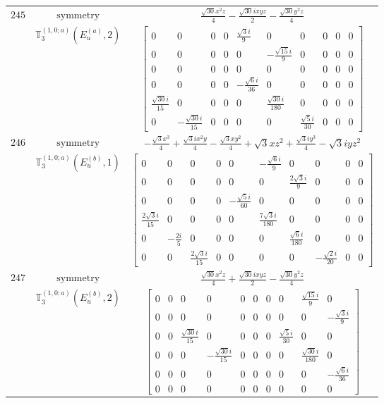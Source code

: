 \documentclass[fleqn,8pt,landscape]{jsarticle}
\begin{document}
\begin{longtable}{ccc}
$ 245 $ & $ \text{symmetry} $ & $ \frac{\sqrt{30} x^{2} z}{4} - \frac{\sqrt{30} i x y z}{2} - \frac{\sqrt{30} y^{2} z}{4} $ \\
$  $ & $ \mathbb{T}_{3}^{(1,0;a)}(E_{u}^{(a)},2) $ & $ \begin{bmatrix} 0 & 0 & 0 & 0 & \frac{\sqrt{3} i}{9} & 0 & 0 & 0 & 0 & 0 \\ 0 & 0 & 0 & 0 & 0 & - \frac{\sqrt{15} i}{9} & 0 & 0 & 0 & 0 \\ 0 & 0 & 0 & 0 & 0 & 0 & 0 & 0 & 0 & 0 \\ 0 & 0 & 0 & 0 & - \frac{\sqrt{6} i}{36} & 0 & 0 & 0 & 0 & 0 \\ \frac{\sqrt{30} i}{15} & 0 & 0 & 0 & 0 & \frac{\sqrt{30} i}{180} & 0 & 0 & 0 & 0 \\ 0 & - \frac{\sqrt{30} i}{15} & 0 & 0 & 0 & 0 & \frac{\sqrt{5} i}{30} & 0 & 0 & 0 \end{bmatrix} $ \\ \hline
$ 246 $ & $ \text{symmetry} $ & $ - \frac{\sqrt{3} x^{3}}{4} + \frac{\sqrt{3} i x^{2} y}{4} - \frac{\sqrt{3} x y^{2}}{4} + \sqrt{3} x z^{2} + \frac{\sqrt{3} i y^{3}}{4} - \sqrt{3} i y z^{2} $ \\
$  $ & $ \mathbb{T}_{3}^{(1,0;a)}(E_{u}^{(b)},1) $ & $ \begin{bmatrix} 0 & 0 & 0 & 0 & 0 & - \frac{\sqrt{6} i}{9} & 0 & 0 & 0 & 0 \\ 0 & 0 & 0 & 0 & 0 & 0 & \frac{2 \sqrt{3} i}{9} & 0 & 0 & 0 \\ 0 & 0 & 0 & 0 & - \frac{\sqrt{5} i}{60} & 0 & 0 & 0 & 0 & 0 \\ \frac{2 \sqrt{3} i}{15} & 0 & 0 & 0 & 0 & \frac{7 \sqrt{3} i}{180} & 0 & 0 & 0 & 0 \\ 0 & - \frac{2 i}{5} & 0 & 0 & 0 & 0 & \frac{\sqrt{6} i}{180} & 0 & 0 & 0 \\ 0 & 0 & \frac{2 \sqrt{3} i}{15} & 0 & 0 & 0 & 0 & - \frac{\sqrt{2} i}{20} & 0 & 0 \end{bmatrix} $ \\ \hline
$ 247 $ & $ \text{symmetry} $ & $ \frac{\sqrt{30} x^{2} z}{4} + \frac{\sqrt{30} i x y z}{2} - \frac{\sqrt{30} y^{2} z}{4} $ \\
$  $ & $ \mathbb{T}_{3}^{(1,0;a)}(E_{u}^{(b)},2) $ & $ \begin{bmatrix} 0 & 0 & 0 & 0 & 0 & 0 & 0 & 0 & \frac{\sqrt{15} i}{9} & 0 \\ 0 & 0 & 0 & 0 & 0 & 0 & 0 & 0 & 0 & - \frac{\sqrt{3} i}{9} \\ 0 & 0 & \frac{\sqrt{30} i}{15} & 0 & 0 & 0 & 0 & \frac{\sqrt{5} i}{30} & 0 & 0 \\ 0 & 0 & 0 & - \frac{\sqrt{30} i}{15} & 0 & 0 & 0 & 0 & \frac{\sqrt{30} i}{180} & 0 \\ 0 & 0 & 0 & 0 & 0 & 0 & 0 & 0 & 0 & - \frac{\sqrt{6} i}{36} \\ 0 & 0 & 0 & 0 & 0 & 0 & 0 & 0 & 0 & 0 \end{bmatrix} $ \\ \hline

\end{longtable}
\end{document}
